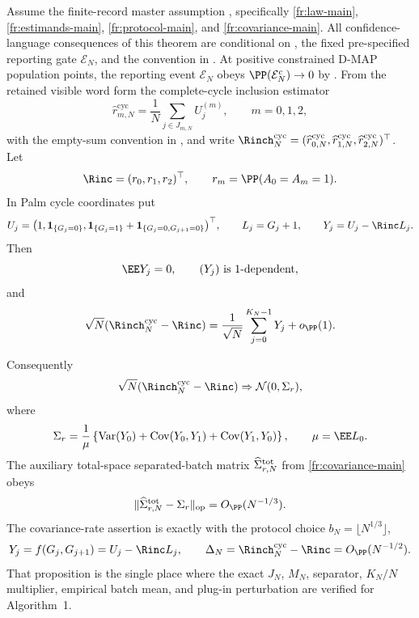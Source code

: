 \begin{proposition}\label{prop:finite-record-inference-audit-detailed}
Assume the finite-record master assumption
, specifically
\ref{fr:law-main}, \ref{fr:estimands-main}, \ref{fr:protocol-main}, and
\ref{fr:covariance-main}.
All confidence-language consequences of this theorem are conditional on
, the fixed pre-specified reporting
gate \(\mathcal E_N\), and the convention in
.
At positive constrained D-MAP population points, the reporting event
\(\mathcal E_N\) obeys \(\PP(\mathcal E_N^c)\to0\) by
.
From the retained visible word form the complete-cycle inclusion estimator
\[
\widehat r_{m,N}^{\mathrm{cyc}}
=\frac1N\sum_{j\in J_{m,N}}U_j^{(m)},\qquad m=0,1,2,
\]
with the empty-sum convention in
, and write
\(\Rinch_N^{\mathrm{cyc}}
=(\widehat r_{0,N}^{\mathrm{cyc}},
  \widehat r_{1,N}^{\mathrm{cyc}},
  \widehat r_{2,N}^{\mathrm{cyc}})^\top\).  Let
\[
\Rinc=(r_0,r_1,r_2)^\top,\qquad r_m=\PP(A_0=A_m=1).
\]
In Palm cycle coordinates put
\[
U_j=
\bigl(1,\mathbf1_{\{G_j=0\}},
\mathbf1_{\{G_j=1\}}+\mathbf1_{\{G_j=0,G_{j+1}=0\}}\bigr)^\top,
\qquad
L_j=G_j+1,\qquad
Y_j=U_j-\Rinc L_j .
\]
Then
\[
\EE Y_j=0,\qquad (Y_j)\text{ is \(1\)-dependent},
\]
and
\[
\sqrt N(\Rinch_N^{\mathrm{cyc}}-\Rinc)
=\frac1{\sqrt N}\sum_{j=0}^{K_N-1}Y_j+o_{\PP}(1).
\]

Consequently
\[
\sqrt N(\Rinch_N^{\mathrm{cyc}}-\Rinc)
\Rightarrow \mathcal N(0,\Sigma_r),
\]
where
\[
\Sigma_r=\frac1\mu\left\{\operatorname{Var}(Y_0)
+\operatorname{Cov}(Y_0,Y_1)+\operatorname{Cov}(Y_1,Y_0)\right\},
\qquad \mu=\EE L_0 .
\]
The auxiliary total-space separated-batch matrix
\(\widehat\Sigma_{r,N}^{\rm tot}\) from
\ref{fr:covariance-main} obeys
\[
\|\widehat\Sigma_{r,N}^{\rm tot}-\Sigma_r\|_{\operatorname{op}}
=O_{\PP}(N^{-1/3}).
\]
The covariance-rate assertion is exactly
 with the protocol
choice \(b_N=\lfloor N^{1/3}\rfloor\),
\[
Y_j=f(G_j,G_{j+1})=U_j-\Rinc L_j,\qquad
\Delta_N=\Rinch_N^{\mathrm{cyc}}-\Rinc=O_{\PP}(N^{-1/2}).
\]
That proposition is the single place where the exact \(J_N\), \(M_N\),
separator, \(K_N/N\) multiplier, empirical batch mean, and plug-in
perturbation are verified for Algorithm~1.
\end{proposition}

